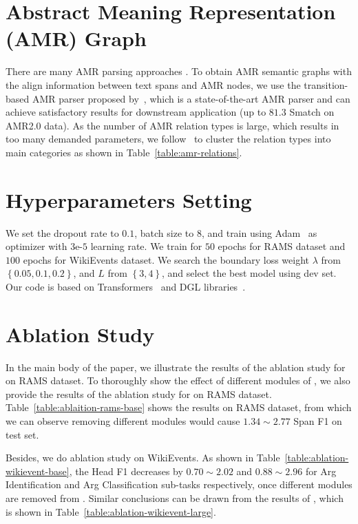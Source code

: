 
\section{Abstract Meaning Representation (AMR) Graph}
\label{sec:appendix-amr}
There are many AMR parsing approaches \cite{bevil-spring,fernandez-astudillo-etal-2020-transition, wang2021hierarchical, chen-amr}.
To obtain AMR semantic graphs with the align information between text spans and AMR nodes, we use the transition-based AMR parser proposed by~\citet{fernandez-astudillo-etal-2020-transition}, which is a state-of-the-art AMR parser and can achieve satisfactory results for downstream application (up to $81.3$ Smatch on AMR2.0 data).
As the number of AMR relation types is large, which results in too many demanded parameters, we follow~\citet{zhangzixuan} to cluster the relation types into main categories as shown in Table~\ref{table:amr-relations}.


\section{Hyperparameters Setting}
\label{sec:appendix-hyperparameters}
We set the dropout rate to $0.1$, batch size to $8$, and train \modelname  using Adam~\cite{adam} as optimizer with $3\text{e-}5$ learning rate.
We train \modelname for $50$ epochs for RAMS dataset and $100$ epochs for WikiEvents dataset. 
We search the boundary loss weight $\lambda$ from $\left \{  0.05, 0.1, 0.2\right \}$, and $L$ from $\left \{  3, 4 \right \}$, and select the best model using dev set.
Our code is based on Transformers~\cite{transformers} and DGL libraries~\cite{dgl}.

\section{Ablation Study}
\label{sec:appendix-ablation}

In the main body of the paper, we illustrate the results of the ablation study for \modelnamelarge on RAMS dataset.
To thoroughly show the effect of different modules of \modelname, we also provide the results of the ablation study for \modelnamebase on RAMS dataset.
Table~\ref{table:ablaition-rams-base} shows the results on RAMS dataset, from which we can observe removing different modules would cause $1.34\sim2.77$ Span F1 on test set.

Besides, we do ablation study on WikiEvents.
As shown in Table~\ref{table:ablation-wikievent-base}, the Head F1 decreases by $0.70\sim2.02$ and $0.88\sim2.96$ for Arg Identification and Arg Classification sub-tasks respectively, once different modules are removed from \modelnamebase.
Similar conclusions can be drawn from the results of \modelnamelarge, which is shown in Table~\ref{table:ablation-wikievent-large}.




